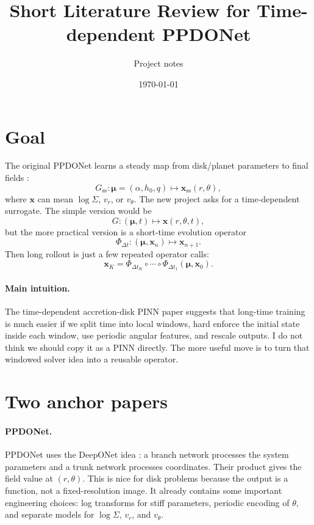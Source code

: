 \documentclass[11pt]{article}
\title{Short Literature Review for Time-dependent PPDONet}
\author{Project notes}
\date{\today}
\newcommand{\muvec}{\bm{\mu}}
\newcommand{\xfield}{\bm{x}}
\begin{document}
\maketitle

\section{Goal}

The original PPDONet learns a steady map from disk/planet parameters to final
fields \cite{mao2023ppdonet}:
\begin{equation}
    G_{\mathrm{ss}}:\muvec=(\alpha,h_0,q)\mapsto
    \xfield_{\mathrm{ss}}(r,\theta),
\end{equation}
where \(\xfield\) can mean \(\log\Sigma\), \(v_r\), or \(v_\theta\). The new
project asks for a time-dependent surrogate. The simple version would be
\begin{equation}
    G:\left(\muvec,t\right)\mapsto \xfield(r,\theta,t),
\end{equation}
but the more practical version is a short-time evolution operator
\begin{equation}
    \Phi_{\Delta t}:\left(\muvec,\xfield_n\right)\mapsto \xfield_{n+1}.
\end{equation}
Then long rollout is just a few repeated operator calls:
\begin{equation}
    \xfield_K
    =
    \Phi_{\Delta t_K}\circ\cdots\circ\Phi_{\Delta t_1}
    (\muvec,\xfield_0).
\end{equation}

\paragraph{Main intuition.}
The time-dependent accretion-disk PINN paper \cite{timepinn2025disk} suggests
that long-time training is much easier if we split time into local windows, hard
enforce the initial state inside each window, use periodic angular features, and
rescale outputs. I do not think we should copy it as a PINN directly. The more
useful move is to turn that windowed solver idea into a reusable operator.

\section{Two anchor papers}

\paragraph{PPDONet.}
PPDONet uses the DeepONet idea \cite{lu2021deeponet}: a branch network processes
the system parameters and a trunk network processes coordinates. Their product
gives the field value at \((r,\theta)\). This is nice for disk problems because
the output is a function, not a fixed-resolution image. It already contains some
important engineering choices: log transforms for stiff parameters, periodic
encoding of \(\theta\), and separate models for \(\log\Sigma\), \(v_r\), and
\(v_\theta\).
\end{document}

